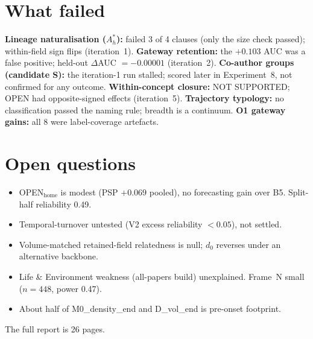 \documentclass[10pt,letterpaper]{article}
\begin{document}
\section{What failed}

\textbf{Lineage naturalisation ($A^*_h$):} failed 3 of 4 clauses (only the size check passed); within-field sign flips (iteration~1).
\textbf{Gateway retention:} the $+0.103$ AUC was a false positive; held-out $\Delta$AUC $= -0.00001$ (iteration~2).
\textbf{Co-author groups (candidate S):} the iteration-1 run stalled; scored later in Experiment~8, not confirmed for any outcome.
\textbf{Within-concept closure:} NOT SUPPORTED; OPEN had opposite-signed effects (iteration~5).
\textbf{Trajectory typology:} no classification passed the naming rule; breadth is a continuum.
\textbf{O1 gateway gains:} all 8 were label-coverage artefacts.

\section{Open questions}

\begin{itemize}[nosep,leftmargin=1.5em]
    \item OPEN$_{\text{home}}$ is modest (PSP $+0.069$ pooled), no forecasting gain over B5. Split-half reliability 0.49.
    \item Temporal-turnover untested (V2 excess reliability $<0.05$), not settled.
    \item Volume-matched retained-field relatedness is null; $d_0$ reverses under an alternative backbone.
    \item Life \& Environment weakness (all-papers build) unexplained. Frame~N small ($n = 448$, power 0.47).
    \item About half of M0\_density\_end and D\_vol\_end is pre-onset footprint.
\end{itemize}

\smallskip
The full report is 26 pages.
\end{document}

